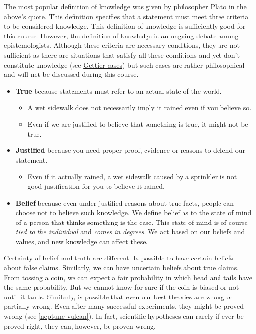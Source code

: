 \documentclass[
]{book}
\providecommand{\tightlist}{%
  \setlength{\itemsep}{0pt}\setlength{\parskip}{0pt}}
\begin{document}
The most popular definition of knowledge was given by philosopher Plato in the above's quote. This definition specifies that a statement must meet three criteria to be considered knowledge. This definition of knowledge is sufficiently good for this course. However, the definition of knowledge is an ongoing debate among epistemologists. Although these criteria are necessary conditions, they are not sufficient as there are situations that satisfy all these conditions and yet don't constitute knowledge (see \href{https://en.wikipedia.org/wiki/Gettier_case}{Gettier cases}) but such cases are rather philosophical and will not be discussed during this course.

\begin{itemize}
\tightlist
\item
  \textbf{True} because statements must refer to an actual state of the world.

  \begin{itemize}
  \tightlist
  \item
    A wet sidewalk does not necessarily imply it rained even if you believe so.
  \item
    Even if we are justified to believe that something is true, it might not be true.
  \end{itemize}
\item
  \textbf{Justified} because you need proper proof, evidence or reasons to defend our statement.

  \begin{itemize}
  \tightlist
  \item
    Even if it actually rained, a wet sidewalk caused by a sprinkler is not good justification for you to believe it rained.
  \end{itemize}
\item
  \textbf{Belief} because even under justified reasons about true facts, people can choose not to believe such knowledge. We define belief as to the state of mind of a person that thinks something is the case. This state of mind is of course \emph{tied to the individual} and \emph{comes in degrees}. We act based on our beliefs and values, and new knowledge can affect these.
\end{itemize}

Certainty of belief and truth are different. Is possible to have certain beliefs about false claims.
Similarly, we can have uncertain beliefs about true claims. From tossing a coin, we can expect a fair probability in which head and tails have the same probability. But we cannot know for sure if the coin is biased or not until it lands. Similarly, is possible that even our best theories are wrong or partially wrong. Even after many successful experiments, they might be proved wrong (see \ref{neptune-vulcan}). In fact, scientific hypotheses can rarely if ever be proved right, they can, however, be proven wrong.
\end{document}
